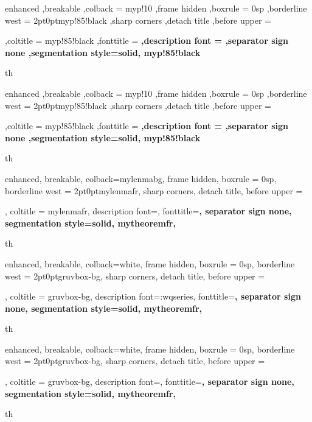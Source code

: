 
{%
	enhanced
	,breakable
	,colback = myp!10
	,frame hidden
	,boxrule = 0sp
	,borderline west = {2pt}{0pt}{myp!85!black}
	,sharp corners
	,detach title
	,before upper = \tcbtitle\par\smallskip
	,coltitle = myp!85!black
	,fonttitle = \bfseries\sffamily
	,description font = \mdseries
	,separator sign none
	,segmentation style={solid, myp!85!black}
}
{th}


{%
	enhanced
	,breakable
	,colback = myp!10
	,frame hidden
	,boxrule = 0sp
	,borderline west = {2pt}{0pt}{myp!85!black}
	,sharp corners
	,detach title
	,before upper = \tcbtitle\par\smallskip
	,coltitle = myp!85!black
	,fonttitle = \bfseries{}\selectfont 
	,description font = \mdseries{}\selectfont 
	,separator sign none
	,segmentation style={solid, myp!85!black}
}
{th}



{
	enhanced,
	breakable,
	colback=mylenmabg,
	frame hidden,
	boxrule = 0sp,
	borderline west = {2pt}{0pt}{mylenmafr},
	sharp corners,
	detach title,
	before upper = \tcbtitle\par\smallskip,
	coltitle = mylenmafr,
	description font=\mdseries{}\selectfont,
	fonttitle=\selectfont\bfseries,
	separator sign none,
	segmentation style={solid, mytheoremfr},
}
{th}


{
	enhanced,
	breakable,
	colback=white,
	frame hidden,
	boxrule = 0sp,
	borderline west = {2pt}{0pt}{gruvbox-bg},
	sharp corners,
	detach title,
	before upper = \tcbtitle\par\smallskip,
	coltitle = gruvbox-bg,
	description font=\md:wqseries\selectfont,
	fonttitle=\selectfont\bfseries,
	separator sign none,
	segmentation style={solid, mytheoremfr},
}
{th}


{
	enhanced,
	breakable,
	colback=white,
	frame hidden,
	boxrule = 0sp,
	borderline west = {2pt}{0pt}{gruvbox-bg},
	sharp corners,
	detach title,
	before upper = \tcbtitle\par\smallskip,
	coltitle = gruvbox-bg,
	description font=\mdseries{}\selectfont,
	fonttitle=\selectfont\bfseries,
	separator sign none,
	segmentation style={solid, mytheoremfr},
}
{th}


